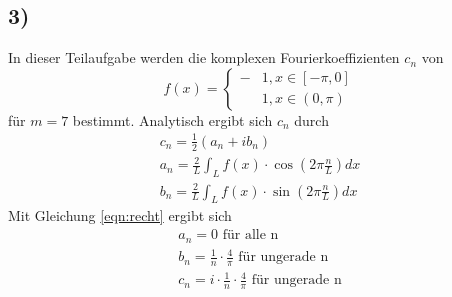 \subsection*{3)}
In dieser Teilaufgabe werden die komplexen Fourierkoeffizienten $c_n$ von 
\begin{equation}
    f(x) = \begin{cases}
        -&1, x \in \left[ - \pi, 0\right] \\
         &1, x \in \left(0 , \pi\right)
    \end{cases}
    \label{eqn:recht}
\end{equation}
für $ m = 7 $ bestimmt. 
Analytisch ergibt sich $c_n$ durch 
\begin{align}
    c_n = \frac{1}{2} \left( a_n + i b_n \right) \\
    a_n = \frac{2}{L} \int_L f(x) \cdot \cos(  2\pi \frac{n}{L}) dx \\
    b_n = \frac{2}{L} \int_L f(x) \cdot \sin(  2\pi \frac{n}{L}) dx
\end{align}
Mit Gleichung \eqref{eqn:recht} ergibt sich 
\begin{align}
    a_n = 0 \text{  für alle n} \\
    b_n = \frac{1}{n} \cdot \frac{4}{\pi} \text{    für ungerade n} \\
    c_n = i \cdot \frac{1}{n} \cdot \frac{4}{\pi} \text{    für ungerade n}
\end{align}
